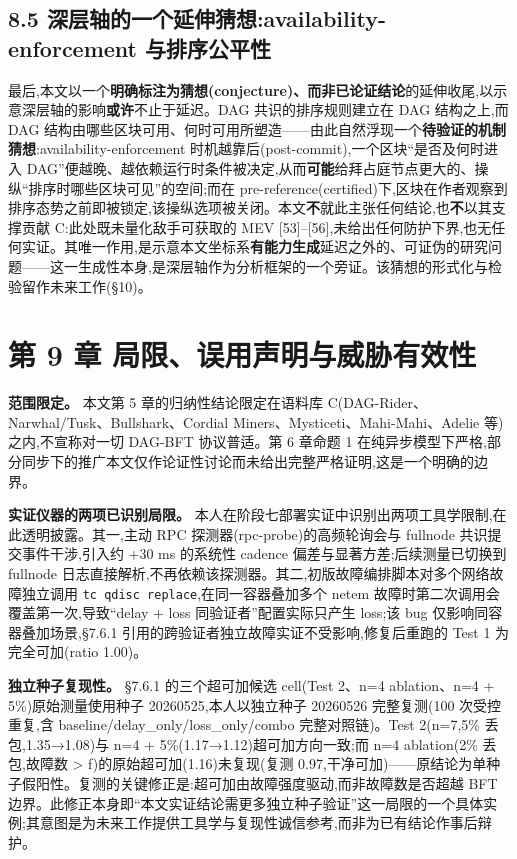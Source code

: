 \documentclass[UTF8,fontset=windows,a4paper,11pt]{ctexart}
\begin{document}
\subsection{8.5 深层轴的一个延伸猜想:availability-enforcement
与排序公平性}\label{ux6df1ux5c42ux8f74ux7684ux5ef6ux4f38availability-enforcement-ux4e0eux6392ux5e8fux516cux5e73ux6027}

最后,本文以一个\textbf{明确标注为猜想(conjecture)、而非已论证结论}的延伸收尾,以示意深层轴的影响\textbf{或许}不止于延迟。DAG
共识的排序规则建立在 DAG 结构之上,而 DAG
结构由哪些区块可用、何时可用所塑造------由此自然浮现一个\textbf{待验证的机制猜想}:availability-enforcement
时机越靠后(post-commit),一个区块``是否及何时进入
DAG''便越晚、越依赖运行时条件被决定,从而\textbf{可能}给拜占庭节点更大的、操纵``排序时哪些区块可见''的空间;而在
pre-reference(certified)下,区块在作者观察到排序态势之前即被锁定,该操纵选项被关闭。本文\textbf{不}就此主张任何结论,也\textbf{不}以其支撑贡献
C:此处既未量化敌手可获取的 MEV
{[}53{]}--{[}56{]},未给出任何防护下界,也无任何实证。其唯一作用,是示意本文坐标系\textbf{有能力生成}延迟之外的、可证伪的研究问题------这一生成性本身,是深层轴作为分析框架的一个旁证。该猜想的形式化与检验留作未来工作(§10)。

\section{第 9 章
局限、误用声明与威胁有效性}\label{ux7b2c-9-ux7ae0-ux5c40ux9650ux8befux7528ux58f0ux660eux4e0eux5a01ux80c1ux6709ux6548ux6027}

\textbf{范围限定。} 本文第 5 章的归纳性结论限定在语料库
C(DAG-Rider、Narwhal/Tusk、Bullshark、Cordial
Miners、Mysticeti、Mahi-Mahi、Adelie 等)之内,不宣称对一切 DAG-BFT
协议普适。第 6 章命题 1
在纯异步模型下严格,部分同步下的推广本文仅作论证性讨论而未给出完整严格证明,这是一个明确的边界。

\textbf{实证仪器的两项已识别局限。}
本人在阶段七部署实证中识别出两项工具学限制,在此透明披露。其一,主动 RPC
探测器(rpc-probe)的高频轮询会与 fullnode 共识提交事件干涉,引入约 +30 ms
的系统性 cadence 偏差与显著方差;后续测量已切换到 fullnode
日志直接解析,不再依赖该探测器。其二,初版故障编排脚本对多个网络故障独立调用
\texttt{tc\ qdisc\ replace},在同一容器叠加多个 netem
故障时第二次调用会覆盖第一次,导致``delay + loss 同验证者''配置实际只产生
loss;该 bug 仅影响同容器叠加场景,§7.6.1
引用的跨验证者独立故障实证不受影响,修复后重跑的 Test 1 为完全可加(ratio
1.00)。

\textbf{独立种子复现性。} §7.6.1 的三个超可加候选 cell(Test 2、n=4
ablation、n=4 + 5\%)原始测量使用种子 20260525,本人以独立种子 20260526
完整复测(100 次受控重复,含 baseline/delay\_only/loss\_only/combo
完整对照链)。Test 2(n=7,5\% 丢包,1.35→1.08)与 n=4 +
5\%(1.17→1.12)超可加方向一致;而 n=4 ablation(2\% 丢包,故障数
\textgreater{} f)的原始超可加(1.16)未复现(复测
0.97,干净可加)------原结论为单种子假阳性。复测的关键修正是:超可加由故障强度驱动,而非故障数是否超越
BFT
边界。此修正本身即``本文实证结论需更多独立种子验证''这一局限的一个具体实例;其意图是为未来工作提供工具学与复现性诚信参考,而非为已有结论作事后辩护。
\end{document}
